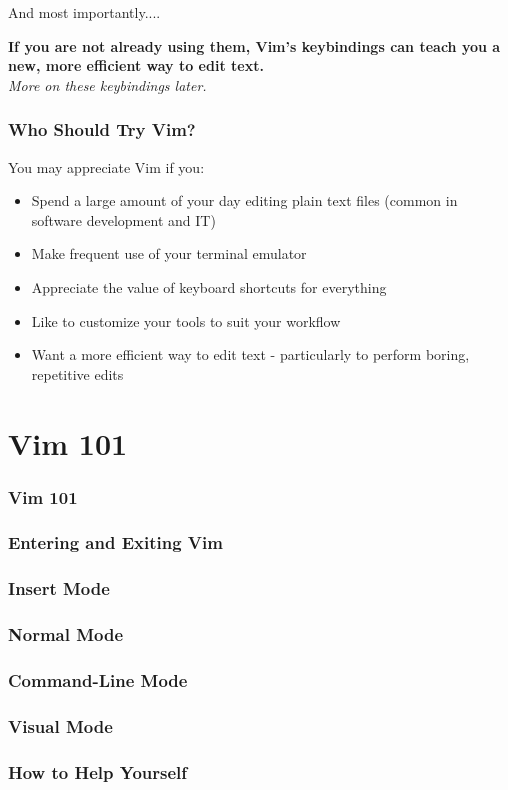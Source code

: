 \documentclass{beamer}
\begin{document}
\begin{frame}
    \centerline{\large And most importantly....}
    \vspace{0.5cm}
    \small \textbf{If you are not already using them, Vim's keybindings can teach you a new, more efficient way to edit text.}\\
    \vspace{0.5cm}
    \textit{More on these keybindings later.}
\end{frame}

\begin{frame}
    \frametitle{Who Should Try Vim?}
    \centerline{\large You may appreciate Vim if you:}
    \vspace{0.5cm}
    \begin{itemize}
	\item Spend a large amount of your day editing plain text files (common in software development and IT)
	\item Make frequent use of your terminal emulator
	\item Appreciate the value of keyboard shortcuts for everything
	\item Like to customize your tools to suit your workflow
	\item Want a more efficient way to edit text - particularly to perform boring, repetitive edits
    \end{itemize}
\end{frame}

\section{Vim 101}
\begin{frame}
    \frametitle{Vim 101}
    \tableofcontents[currentsection]
\end{frame}
\begin{frame}
    \frametitle{Entering and Exiting Vim}
\end{frame}
\begin{frame}
    \frametitle{Insert Mode}
\end{frame}
\begin{frame}
    \frametitle{Normal Mode}
\end{frame}
\begin{frame}
    \frametitle{Command-Line Mode}
\end{frame}
\begin{frame}
    \frametitle{Visual Mode}
\end{frame}
\begin{frame}
    \frametitle{How to Help Yourself}
\end{frame}
\end{document}
